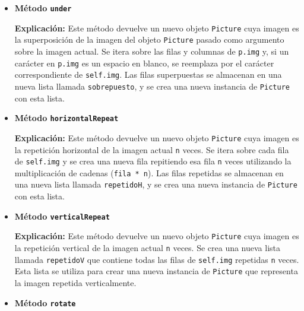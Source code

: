 \documentclass{article}
\begin{document}
\begin{itemize}
    \item \textbf{Método \texttt{under}}



\textbf{Explicación:}
Este método devuelve un nuevo objeto \texttt{Picture} cuya imagen es la superposición de la imagen del objeto \texttt{Picture} pasado como argumento sobre la imagen actual. Se itera sobre las filas y columnas de \texttt{p.img} y, si un carácter en \texttt{p.img} es un espacio en blanco, se reemplaza por el carácter correspondiente de \texttt{self.img}. Las filas superpuestas se almacenan en una nueva lista llamada \texttt{sobrepuesto}, y se crea una nueva instancia de \texttt{Picture} con esta lista.

    \item \textbf{Método \texttt{horizontalRepeat}}



\textbf{Explicación:}
Este método devuelve un nuevo objeto \texttt{Picture} cuya imagen es la repetición horizontal de la imagen actual \texttt{n} veces. Se itera sobre cada fila de \texttt{self.img} y se crea una nueva fila repitiendo esa fila \texttt{n} veces utilizando la multiplicación de cadenas (\texttt{fila * n}). Las filas repetidas se almacenan en una nueva lista llamada \texttt{repetidoH}, y se crea una nueva instancia de \texttt{Picture} con esta lista.

    \item \textbf{Método \texttt{verticalRepeat}}



\textbf{Explicación:}
Este método devuelve un nuevo objeto \texttt{Picture} cuya imagen es la repetición vertical de la imagen actual \texttt{n} veces. Se crea una nueva lista llamada \texttt{repetidoV} que contiene todas las filas de \texttt{self.img} repetidas \texttt{n} veces. Esta lista se utiliza para crear una nueva instancia de \texttt{Picture} que representa la imagen repetida verticalmente.

    \item \textbf{Método \texttt{rotate}}




\end{itemize}
\end{document}
